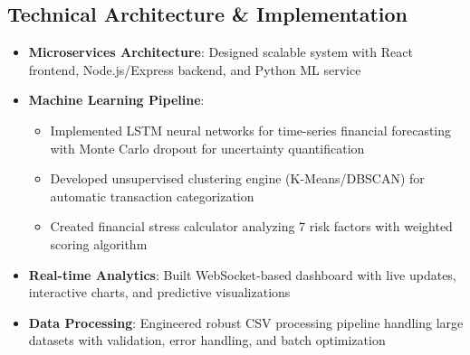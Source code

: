 \documentclass[11pt]{article}
\begin{document}
\subsection*{Technical Architecture \& Implementation}
\begin{itemize}[leftmargin=*]
    \item \textbf{Microservices Architecture}: Designed scalable system with React frontend, Node.js/Express backend, and Python ML service
    \item \textbf{Machine Learning Pipeline}: 
        \begin{itemize}
            \item Implemented LSTM neural networks for time-series financial forecasting with Monte Carlo dropout for uncertainty quantification
            \item Developed unsupervised clustering engine (K-Means/DBSCAN) for automatic transaction categorization
            \item Created financial stress calculator analyzing 7 risk factors with weighted scoring algorithm
        \end{itemize}
    \item \textbf{Real-time Analytics}: Built WebSocket-based dashboard with live updates, interactive charts, and predictive visualizations
    \item \textbf{Data Processing}: Engineered robust CSV processing pipeline handling large datasets with validation, error handling, and batch optimization
\end{itemize}
\end{document}
